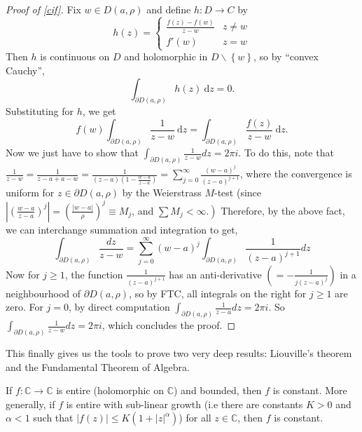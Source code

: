 \documentclass[egregdoesnotlikesansseriftitles,a4paper]{scrartcl}
\begin{document}
\begin{proof}[Proof of \ref{cif}]
     Fix $w \in D (a, \rho)$ and define $h: D \rightarrow C$ by 
     \begin{equation*}
           h (z)=
           \begin{cases}
                \frac{f (z)-f (w)}{z-w}& z \neq w\\
                f' (w) & z=w
           \end{cases}
     \end{equation*}
     Then $h$ is continuous on $D$ and holomorphic in $D \backslash \left\{w\right\}$, so by ``convex Cauchy'', \[
     \int_{ \partial D (a,\rho)}^{}h (z) \ \mathrm{d}z=0 
     .\] Substituting for $h$, we get \[
     f (w) \int_{ \partial D (a,\rho)}^{} \frac{1}{z-w} \ \mathrm{d}z=\int_{ \partial D (a,\rho)}^{} \frac{f (z)}{z-w} \ \mathrm{d}z
     .\] Now we just have to show that $\int_{\partial D(a, \rho)} \frac{1}{z-w} d z=2 \pi i$. To do this, note that $\frac{1}{z-w}=\frac{1}{z-a+a-w}=\frac{1}{(z-a)\left(1-\frac{w-a}{z-a}\right)}=\sum_{j=0}^{\infty} \frac{(w-a)^{j}}{(z-a)^{j+1}}$, where the convergence is uniform for $z \in \partial D(a, \rho)$ by the Weierstrass $M$-test (since $\left|\left(\frac{w-a}{z-a}\right)^{j}\right|=\left(\frac{|w-a|}{\rho}\right)^{j} \equiv M_{j}$, and $\left.\sum M_{j}<\infty .\right)$ Therefore, by the above fact, we can interchange summation and integration to get,
     $$
     \int_{\partial D(a, \rho)} \frac{d z}{z-w}=\sum_{j=0}^{\infty}(w-a)^{j} \int_{\partial D(a, \rho)} \frac{1}{(z-a)^{j+1}} d z
     $$
     Now for $j \geq 1$, the function $\frac{1}{(z-a)^{j+1}}$ has an anti-derivative $\left(=-\frac{1}{j(z-a)^{j}}\right)$ in a neighbourhood of $\partial D(a, \rho)$, so by FTC, all integrals on the right for $j \geq 1$ are zero. For $j=0$, by direct computation $\int_{\partial D(a, \rho)} \frac{1}{z-a} d z=2 \pi i$.
     So $\int_{\partial D(a, \rho)} \frac{1}{z-w} d z=2 \pi i$, which concludes the proof.
\end{proof}
This finally gives us the tools to prove two very deep results: Liouville's theorem and the Fundamental Theorem of Algebra.
\begin{theorem}
      If $f: \mathbb{C} \rightarrow \mathbb{C}$ is entire (holomorphic on $\mathbb{C}$) and bounded, then $f$ is constant. More generally, if $f$ is entire with sub-linear growth (i.e there are constants $K>0$ and $\alpha<1$ such that $\left|f (z)\right|\leq K (1+\left|z\right|^{\alpha})$) for all $z \in \mathbb{C}$, then $f$ is constant. 
\end{theorem}
\end{document}
